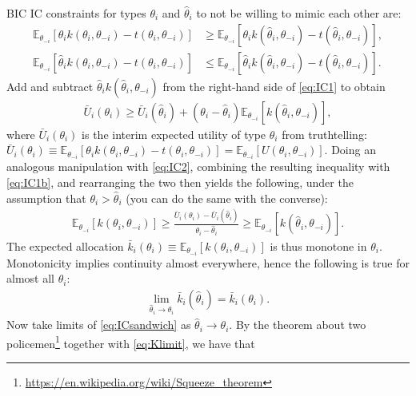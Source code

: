 \documentclass[a4paper]{article}
\begin{document}
	BIC IC constraints for types $\theta_i$ and $\hat{\theta}_i$ to not be willing to mimic each other are:
	\begin{align}
		\mathbb{E}_{\theta_{-i}}\left[ \theta_{i} k(\theta_i,\theta_{-i}) - t(\theta_i,\theta_{-i}) \right] &\geq 
		\mathbb{E}_{\theta_{-i}}\left[ \theta_{i} k(\hat{\theta}_i,\theta_{-i}) - t(\hat{\theta}_i,\theta_{-i}) \right],
		\label{eq:IC1}
		\\
		\mathbb{E}_{\theta_{-i}}\left[ \hat{\theta}_{i} k(\theta_i,\theta_{-i}) - t(\theta_i,\theta_{-i}) \right] &\leq 
		\mathbb{E}_{\theta_{-i}}\left[ \hat{\theta}_{i} k(\hat{\theta}_i,\theta_{-i}) - t(\hat{\theta}_i,\theta_{-i}) \right].
		\label{eq:IC2}
	\end{align}
	Add and subtract $\hat{\theta}_{i} k(\hat{\theta}_i,\theta_{-i})$ from the right-hand side of \eqref{eq:IC1} to obtain
	\begin{align}
		\bar{U}_i(\theta_i) \geq \bar{U}_i(\hat{\theta}_i) + (\theta_i - \hat{\theta}_i) \mathbb{E}_{\theta_{-i}}\left[ k(\hat{\theta}_i,\theta_{-i}) \right], \label{eq:IC1b}
	\end{align}
	where $\bar{U}_i(\theta_i)$ is the interim expected utility of type $\theta_i$ from truthtelling: $\bar{U}_i(\theta_i) \equiv \mathbb{E}_{\theta_{-i}}\left[ \theta_{i} k(\theta_i,\theta_{-i}) - t(\theta_i,\theta_{-i}) \right] = \mathbb{E}_{\theta_{-i}}\left[ U(\theta_i,\theta_{-i}) \right]$.
	Doing an analogous manipulation with \eqref{eq:IC2}, combining the resulting inequality with \eqref{eq:IC1b}, and rearranging the two then yields the following, under the assumption that $\theta_i > \hat{\theta}_i$ (you can do the same with the converse):
	\begin{align}
		\mathbb{E}_{\theta_{-i}}\left[ k(\theta_i,\theta_{-i}) \right] \geq \frac{\bar{U}_i(\theta_i) - \bar{U}_i(\hat{\theta}_i)}{\theta_i - \hat{\theta}_i} \geq \mathbb{E}_{\theta_{-i}}\left[ k(\hat{\theta}_i,\theta_{-i}) \right] .
		\label{eq:ICsandwich}
	\end{align}
	The expected allocation $\bar{k}_i(\theta_i) \equiv \mathbb{E}_{\theta_{-i}}\left[ k(\theta_i,\theta_{-i}) \right]$ is thus monotone in $\theta_i$. Monotonicity implies continuity almost everywhere, hence the following is true for almost all $\theta_i$:
	\begin{align}
		\lim_{\hat{\theta}_i \to \theta_i} \bar{k}_i(\hat{\theta}_i) = \bar{k}_i(\theta_i).
		\label{eq:Klimit}
	\end{align}
	Now take limits of \eqref{eq:ICsandwich} as $\hat{\theta}_i \to \theta_i$. By the theorem about two policemen\footnote{\url{https://en.wikipedia.org/wiki/Squeeze_theorem}} together with \eqref{eq:Klimit}, we have that
\end{document}
